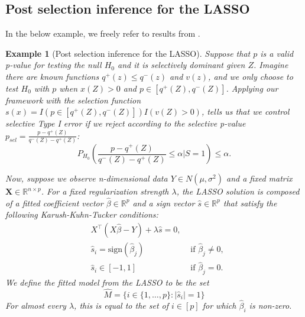 \documentclass{article}
\newtheorem{example}{Example}
\newcommand{\R}{\mathbb{R}}
\newcommand{\X}{\boldsymbol{X}}
\begin{document}
\begin{appendix}
\subsection{Post selection inference for the LASSO}
\label{sec:lasso_appdx}

In the below example, we freely refer to results from \cite{Lee2016}. 

\begin{example}[Post selection inference for the LASSO]

    Suppose that $p$ is a valid p-value for testing the null $H_0$ and it is selectively dominant given $Z$. Imagine there are known functions $q^+(z) \leq q^-(z)$ and $v(z)$, and we only choose to test $H_0$ with $p$ when $x(Z) > 0$ and $p \in [q^+(Z), q^{-}(Z)]$.  Applying our framework with the selection function $s(x) = I(p \in [q^+(Z), q^{-}(Z)])I(v(Z) > 0)$,  tells us that we control selective Type I error if we reject according to the selective p-value $p_{sel} = \frac{p - q^+(Z)}{q^-(Z) - q^+(Z)}$:
    \begin{equation}
        \label{eq:lasso_error_control}
        P_{H_{0}}\left(\frac{p - q^+(Z)}{q^-(Z) - q^+(Z)} \leq \alpha | S = 1\right)  \leq \alpha.
    \end{equation} 
    
    Now, suppose we observe n-dimensional data $Y \in N(\mu, \sigma^2)$ and a fixed matrix $\X \in \R^{n \times p}$. For a fixed regularization strength $\lambda$, the LASSO solution is composed of a fitted coefficient vector $\hat{\beta} \in \R^p$ and a sign vector $\hat{s} \in \R^p$ that satisfy the following Karush-Kuhn-Tucker conditions:
    \begin{align*}
        &X^{\top}(X \hat{\beta} - Y) + \lambda \hat{s} = 0,\\
        &\hat{s}_i = \text{sign}(\hat{\beta}_j)  &\text{ if } \hat{\beta}_j \neq 0,\\
        &\hat{s}_i \in [-1, 1] &\text{ if } \hat{\beta}_j = 0.
    \end{align*}
    We define the fitted model from the LASSO to be the set 
    \begin{equation*}
        \hat{M} = \{i \in \{1, \dots, p\} : |\hat{s}_i| = 1\}
    \end{equation*}
    For almost every $\lambda$, this is equal to the set of $i \in [p]$ for which $\hat{\beta}_i$ is non-zero. 
    

\end{example}
\end{appendix}
\end{document}
